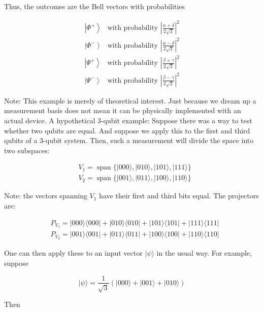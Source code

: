 \documentclass[main.tex]{subfiles}
\begin{document}
    Thus, the outcomes are the Bell vectors with probabilities
    
    $$
    \begin{array}{lc}
    \left|\Phi^{+}\right\rangle & \text {with probability }\left|\frac{\alpha+\delta}{2 \sqrt{2}}\right|^{2} \\
    \left|\Phi^{-}\right\rangle & \text {with probability }\left|\frac{\alpha-\delta}{2 \sqrt{2}}\right|^{2} \\
    \left|\Psi^{+}\right\rangle & \text {with probability }\left|\frac{\beta+\gamma}{2 \sqrt{2}}\right|^{2} \\
    \left|\Psi^{-}\right\rangle & \text {with probability }\left|\frac{\beta-\gamma}{2 \sqrt{2}}\right|^{2}
    \end{array}
    $$

    Note: This example is merely of theoretical interest. Just because we dream up a measurement basis does not mean it can be physically implemented with an actual device. A hypothetical 3-qubit example: Suppose there was a way to test whether two qubits are equal. And suppose we apply this to the first and third qubits of a 3-qubit system. Then, such a measurement will divide the space into two subspaces:
    
    $$
    \begin{aligned}
    &V_{1}=\operatorname{span}\{|000\rangle,|010\rangle,|101\rangle,|111\rangle\} \\
    &V_{2}=\operatorname{span}\{|001\rangle,|011\rangle,|100\rangle,|110\rangle\}
    \end{aligned}
    $$
    
    Note: the vectors spanning $V_{1}$ have their first and third bits equal. The projectors are:
    
    $$
    \begin{aligned}
    &P_{V_{1}}=|000\rangle\langle 000|+| 010\rangle\langle 010|+| 101\rangle\langle 101|+| 111\rangle\langle 111| \\
    &P_{V_{2}}=|001\rangle\langle 001|+| 011\rangle\langle 011|+| 100\rangle\langle 100|+| 110\rangle\langle 110|
    \end{aligned}
    $$
    
    One can then apply these to an input vector $|\psi\rangle$ in the usual way. For example, suppose
    
    $$
    |\psi\rangle=\frac{1}{\sqrt{3}}(|000\rangle+|001\rangle+|010\rangle)
    $$
    
    Then
    
\end{document}
